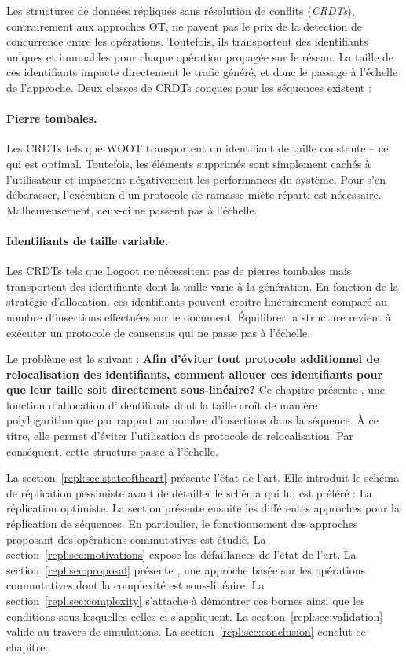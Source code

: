 Les structures de données répliqués sans résolution de conflits (\emph{CRDTs}),
contrairement aux approches OT, ne payent pas le prix de la detection de
concurrence entre les opérations. Toutefois, ils transportent des identifiants
uniques et immuables pour chaque opération propagée sur le réseau. La taille de
ces identifiants impacte directement le trafic généré, et donc le passage à
l'échelle de l'approche. Deux classes de CRDTs conçues pour les séquences
existent :

\paragraph{Pierre tombales.}
Les CRDTs tels que WOOT transportent un identifiant de taille constante -- ce
qui est optimal. Toutefois, les éléments supprimés sont simplement cachés à
l'utilisateur et impactent négativement les performances du système. Pour s'en
débarasser, l'exécution d'un protocole de ramasse-miète réparti est
nécessaire. Malheureusement, ceux-ci ne passent pas à l'échelle.

\paragraph{Identifiants de taille variable.}
Les CRDTs tels que Logoot ne nécessitent pas de pierres tombales mais
transportent des identifiants dont la taille varie à la génération. En fonction
de la stratégie d'allocation, ces identifiants peuvent croitre linérairement
comparé au nombre d'insertions effectuées sur le document. Équilibrer la
structure revient à exécuter un protocole de consensus qui ne passe pas à
l'échelle.

Le problème est le suivant : \textbf{Afin d'éviter tout protocole additionnel de
relocalisation des identifiants, comment allouer ces identifiants pour que leur
taille soit directement sous-linéaire?} Ce chapitre présente \LSEQ, une fonction
d'allocation d'identifiants dont la taille croît de manière polylogarithmique
par rapport au nombre d'insertions dans la séquence. À ce titre, elle permet
d'éviter l'utilisation de protocole de relocalisation. Par conséquent, cette
structure passe à l'échelle. 

La section~\ref{repl:sec:stateoftheart} présente l'état de l'art. Elle introduit
le schéma de réplication pessimiste avant de détailler le schéma qui lui est
préféré : La réplication optimiste. La section présente ensuite les différentes
approches pour la réplication de séquences. En particulier, le fonctionnement
des approches proposant des opérations commutatives est étudié. La
section~\ref{repl:sec:motivations} expose les défaillances de l'état de
l'art. La section~\ref{repl:sec:proposal} présente \LSEQ, une approche basée sur
les opérations commutatives dont la complexité est sous-linéaire. La
section~\ref{repl:sec:complexity} s'attache à démontrer ces bornes ainsi que les
conditions sous lesquelles celles-ci s'appliquent. La
section~\ref{repl:sec:validation} valide \LSEQ au travers de simulations. La
section~\ref{repl:sec:conclusion} conclut ce chapitre.


